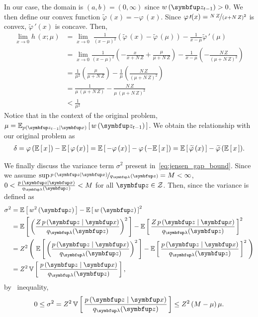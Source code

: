 \begin{proofEnd}
In our case, the domain is \((a,b) = (0, \infty)\) since \(w\,(\vz_{t-1}) > 0\).
We then define our convex function \(\widetilde{\varphi}\,(x) = - \varphi\,(x)\).
Since \(\varphi\,\prime(x) = \nicefrac{N\,Z}{{(x + N\,Z)}^2}\) is convex, \(\widetilde{\varphi}\,\prime(x)\) is concave. Then, 
\begin{align}
  \lim_{x \rightarrow 0} h\,(x; \mu)
  &=
  \lim_{x \rightarrow 0} \; \frac{1}{{(x - \mu)}^2} \left( \widetilde{\varphi}\,(x) - \widetilde{\varphi}\,(\mu) \right)
  - \frac{1}{ x - \mu }  \widetilde{\varphi}\,\prime(\mu)  \\
  &=
  \lim_{x \rightarrow 0} \frac{1}{{(x - \mu)}^2}
  \left(
  - \frac{x}{x + N\,Z} + \frac{\mu}{\mu + N\,Z}
  \right)
  -
  \frac{1}{x - \mu}
  \left(
  - \frac{N\,Z}{ {(\mu + N\,Z)}^2 }
  \right) \\
  &= \frac{1}{\mu^2} \left( \frac{\mu}{\mu + N\,Z} \right)
  - \frac{1}{\mu} \left( \frac{N\,Z}{{(\mu + N\,Z)}^2} \right) \\
  &= \frac{1}{ \mu \, (\mu + N\,Z) }
  - \frac{N\,Z}{ \mu \, {(\mu + N\,Z)}^2} \\
  &< \frac{1}{\mu^2}
\end{align}
Notice that in the context of the original problem, \(\mu = \Esub{p(\vz_{t-1}\mid\vx)}{ w\,(\vz_{t-1}) }\).
We obtain the relationship with our original problem as
\begin{align}
  \delta
  = \varphi\,(\mathbb{E}\left[\,x\,\right]) - \mathbb{E}\left[\,\varphi\,(x)\,\right]
  = \mathbb{E}\left[\,-\varphi\,(x)\,\right] - \varphi\,(-\mathbb{E}\left[\,x\,\right])
  = \mathbb{E}\left[\,\widetilde{\varphi}\,(x)\,\right] - \widetilde{\varphi}\,(\mathbb{E}\left[\,x\,\right]).
\end{align}

We finally discuss the variance term \(\sigma^2\) present in~\eqref{eq:jensen_gap_bound}.
Since we assume \(\sup \nicefrac{p\,(\vz\mid\vx)}{q_{\vlambda}(\vz)} = M < \infty \), \( 0 < \frac{p\,(\vz\mid\vx)}{q_{\vlambda}(\vz)} < M \) for all \(\vz \in \mathcal{Z}\).
Then, since the variance is defined as
\begin{align}
    \sigma^2 &= \E{w^2\,(\vz)} - {\E{w\,(\vz)}}^2 \\
             &= \E{ {\left( \frac{Z\,p\,(\vz\mid\vx)}{q_{\vlambda}(\vz) } \right)}^2 } - {\E{\frac{Z\,p\,(\vz\mid\vx)}{q_{\vlambda}(\vz) }}}^2 \\
             &= Z^2 \left(\; \E{ {\left( \frac{p\,(\vz\mid\vx)}{q_{\vlambda}(\vz) } \right)}^2 } - {\E{\frac{p\,(\vz\mid\vx)}{q_{\vlambda}(\vz) }}}^2 \;\right) \\
             &= Z^2 \, \V{ \frac{p\,(\vz\mid\vx)}{q_{\vlambda}(\vz) } } ,
\end{align}
by~\citet{bhatia_better_2000} inequality,
\begin{equation}
    0 \leq \sigma^2 
    = Z^2 \, \V{ \frac{p\,(\vz\mid\vx)}{q_{\vlambda}(\vz) } }
    \leq Z^2 \, (M - \mu)\,\mu.
\end{equation}


\end{proofEnd}
